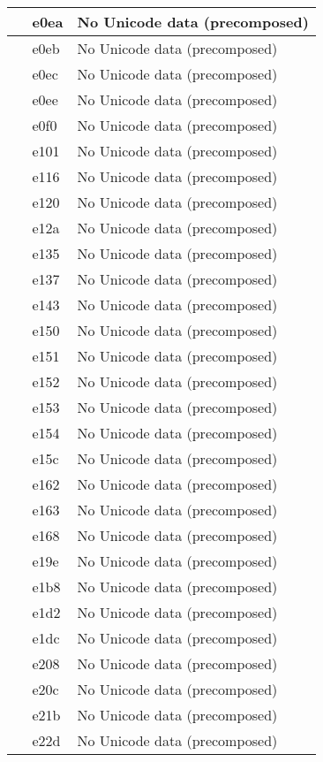 \documentclass[12pt,letterpaper,openany]{book}
\begin{document}
\begin{center}
\begin{supertabular}{|m{0.25in}|m{0.5in}|m{4in}|}
			 & e0ea & No Unicode data (precomposed)\\\hline
			 & e0eb & No Unicode data (precomposed)\\\hline
			 & e0ec & No Unicode data (precomposed)\\\hline
			 & e0ee & No Unicode data (precomposed)\\\hline
			 & e0f0 & No Unicode data (precomposed)\\\hline
			 & e101 & No Unicode data (precomposed)\\\hline
			 & e116 & No Unicode data (precomposed)\\\hline
			 & e120 & No Unicode data (precomposed)\\\hline
			 & e12a & No Unicode data (precomposed)\\\hline
			 & e135 & No Unicode data (precomposed)\\\hline
			 & e137 & No Unicode data (precomposed)\\\hline
			 & e143 & No Unicode data (precomposed)\\\hline
			 & e150 & No Unicode data (precomposed)\\\hline
			 & e151 & No Unicode data (precomposed)\\\hline
			 & e152 & No Unicode data (precomposed)\\\hline
			 & e153 & No Unicode data (precomposed)\\\hline
			 & e154 & No Unicode data (precomposed)\\\hline
			 & e15c & No Unicode data (precomposed)\\\hline
			 & e162 & No Unicode data (precomposed)\\\hline
			 & e163 & No Unicode data (precomposed)\\\hline
			 & e168 & No Unicode data (precomposed)\\\hline
			 & e19e & No Unicode data (precomposed)\\\hline
			 & e1b8 & No Unicode data (precomposed)\\\hline
			 & e1d2 & No Unicode data (precomposed)\\\hline
			 & e1dc & No Unicode data (precomposed)\\\hline
			 & e208 & No Unicode data (precomposed)\\\hline
			 & e20c & No Unicode data (precomposed)\\\hline
			 & e21b & No Unicode data (precomposed)\\\hline
			 & e22d & No Unicode data (precomposed)\\\hline

\end{supertabular}
\end{center}
\end{document}
